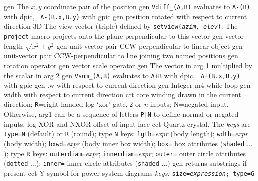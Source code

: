   {gen}
  {The $x, y$ coordinate pair of the position}
  {gen}
  {{\tt Vdiff\_(A,B)} evaluates to {\tt A-(B)} with dpic, {\tt
  A-(B.x,B.y)}
   with gpic}
  {gen}
  {position rotated with respect to current direction}
  {3D} {The view vector (triple) defined by {\tt setview({\sl azim,
  elev})}. The
   {\tt project} macro projects onto the plane perpendicular to this
   vector}
  {gen}
  {vector length $\sqrt{x^2+y^2}$}
  {gen}
  {unit-vector pair CCW-perpendicular to linear object}
  {gen}
  {unit-vector pair CCW-perpendicular to line joining two named
  positions}
  {gen}
  {rotation operator}
  {gen}
  {vector scale operator}
  {gen}
  {The vector in arg 1 multiplied by the scalar in arg 2}
  {gen}
  {{\tt Vsum\_(A,B)} evaluates to {\tt A+B} with dpic, {\tt
  A+(B.x,B.y)}
   with gpic}
%
  {gen}
  {.w with respect to current direction}
  {gen}
  {Integer m4 while loop}
  {gen}
  {width with respect to current direction}
  {cct}
  {core winding drawn in the current direction; {\tt R}=right-handed
   }
  {log}
  {`xor' gate, 2 or {\sl n\/} inputs; N=negated input.
   Otherwise, arg1 can be a sequence of letters {\tt P|N} to define
   normal or negated inputs.
    }
  {log}
  {XOR and NXOR offset of input face}
%
  {cct}
  {Quartz crystal. The {\sl keys} are
     {\tt type=N} (default) or {\tt R} (round);
            type {\tt N} keys:
              {\tt lgth=}{\sl expr} (body length);
              {\tt wdth=}{\sl expr} (body width);
              {\tt bxwd=}{\sl expr} (body inner box width);
              {\tt box=} box attributes ({\tt shaded} $\ldots$);
            type {\tt R} keys:
              {\tt outerdiam=}{\sl expr};
              {\tt innerdiam=}{\sl expr};
              {\tt outer=} outer circle attributes ({\tt dotted} $\ldots$);
              {\tt inner=} inner circle attributes ({\tt shaded} $\ldots$)%
}
  {gen}
  {returns substrings if present}
%
  {cct}
  {Y symbol for power-system diagrams
   {\sl keys:} {\tt size={\sl expression}; type=G}}

